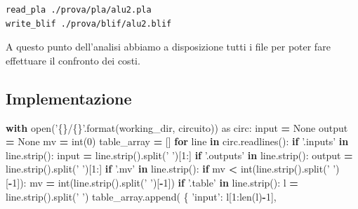 \documentclass[italian,]{book}
\newenvironment{Shaded}{\begin{snugshade}}{\end{snugshade}}
\newcommand{\BuiltInTok}[1]{#1}
\newcommand{\ControlFlowTok}[1]{\textcolor[rgb]{0.13,0.29,0.53}{\textbf{#1}}}
\newcommand{\DecValTok}[1]{\textcolor[rgb]{0.00,0.00,0.81}{#1}}
\newcommand{\ImportTok}[1]{#1}
\newcommand{\KeywordTok}[1]{\textcolor[rgb]{0.13,0.29,0.53}{\textbf{#1}}}
\newcommand{\NormalTok}[1]{#1}
\newcommand{\OperatorTok}[1]{\textcolor[rgb]{0.81,0.36,0.00}{\textbf{#1}}}
\newcommand{\SpecialCharTok}[1]{\textcolor[rgb]{0.00,0.00,0.00}{#1}}
\newcommand{\StringTok}[1]{\textcolor[rgb]{0.31,0.60,0.02}{#1}}
\newcommand{\VariableTok}[1]{\textcolor[rgb]{0.00,0.00,0.00}{#1}}
\begin{document}
\begin{verbatim}
read_pla ./prova/pla/alu2.pla
write_blif ./prova/blif/alu2.blif
\end{verbatim}

A questo punto dell'analisi abbiamo a disposizione tutti i file per poter fare effettuare il confronto dei costi.

\newpage

\hypertarget{implementazione}{%
\subsection{Implementazione}\label{implementazione}}

\begin{Shaded}
\begin{Highlighting}[]
\ControlFlowTok{with} \BuiltInTok{open}\NormalTok{(}\StringTok{'}\SpecialCharTok{\{\}}\StringTok{/}\SpecialCharTok{\{\}}\StringTok{'}\NormalTok{.}\BuiltInTok{format}\NormalTok{(working_dir, circuito)) }\ImportTok{as}\NormalTok{ circ:}
  \BuiltInTok{input} \OperatorTok{=} \VariableTok{None}
\NormalTok{  output }\OperatorTok{=} \VariableTok{None}
\NormalTok{  mv }\OperatorTok{=} \BuiltInTok{int}\NormalTok{(}\DecValTok{0}\NormalTok{)}
\NormalTok{  table_array }\OperatorTok{=}\NormalTok{ []}
  \ControlFlowTok{for}\NormalTok{ line }\KeywordTok{in}\NormalTok{ circ.readlines():}
    \ControlFlowTok{if} \StringTok{'.inputs'} \KeywordTok{in}\NormalTok{ line.strip():}
      \BuiltInTok{input} \OperatorTok{=}\NormalTok{ line.strip().split(}\StringTok{' '}\NormalTok{)[}\DecValTok{1}\NormalTok{:]}
    \ControlFlowTok{if} \StringTok{'.outputs'} \KeywordTok{in}\NormalTok{ line.strip():}
\NormalTok{      output }\OperatorTok{=}\NormalTok{ line.strip().split(}\StringTok{' '}\NormalTok{)[}\DecValTok{1}\NormalTok{:]}
    \ControlFlowTok{if} \StringTok{'.mv'} \KeywordTok{in}\NormalTok{ line.strip():}
      \ControlFlowTok{if}\NormalTok{ mv }\OperatorTok{<} \BuiltInTok{int}\NormalTok{(line.strip().split(}\StringTok{' '}\NormalTok{)[}\OperatorTok{-}\DecValTok{1}\NormalTok{]):}
\NormalTok{        mv }\OperatorTok{=} \BuiltInTok{int}\NormalTok{(line.strip().split(}\StringTok{' '}\NormalTok{)[}\OperatorTok{-}\DecValTok{1}\NormalTok{])}
    \ControlFlowTok{if} \StringTok{'.table'} \KeywordTok{in}\NormalTok{ line.strip():}
\NormalTok{      l }\OperatorTok{=}\NormalTok{ line.strip().split(}\StringTok{' '}\NormalTok{)}
\NormalTok{      table_array.append(}
\NormalTok{        \{}
          \StringTok{'input'}\NormalTok{:    l[}\DecValTok{1}\NormalTok{:}\BuiltInTok{len}\NormalTok{(l)}\OperatorTok{-}\DecValTok{1}\NormalTok{],}

\end{Highlighting}
\end{Shaded}
\end{document}
